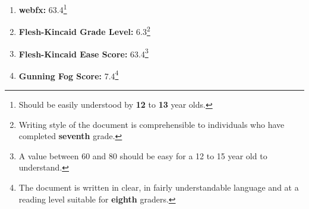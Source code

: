 \renewcommand{\thefootnote}{\alph{footnote}}
\begin{enumerate}[itemsep = 0.1 pt]

      \item{
            \textbf{webfx:} 63.4\footnote{Should be easily understood by \textbf{12} to \textbf{13} year olds.}
            }
      \item{
            \textbf{Flesh-Kincaid Grade Level:} 6.3\footnote{Writing style of the document is comprehensible to individuals who have completed \textbf{seventh} grade.}
            }
      \item{
            \textbf{Flesh-Kincaid Ease Score:} 63.4\footnote{A value between 60 and 80 should be easy for a 12 to 15 year old to understand.}
            }
      \item{
            \textbf{Gunning Fog Score:} 7.4\footnote{The document is written in clear, in fairly understandable language and at a reading level suitable for \textbf{eighth} graders.}
            }
\end{enumerate}